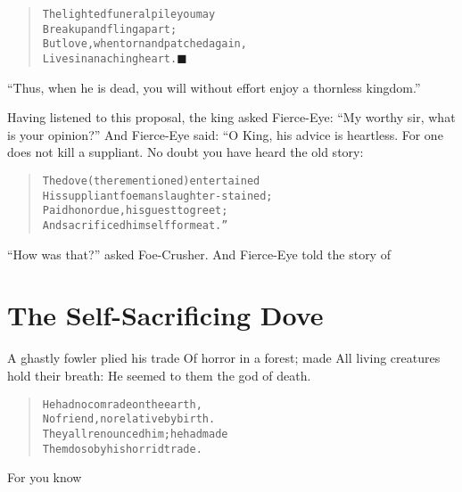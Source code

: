 \documentclass[article, twoside, 14pt]{memoir}
\newcommand{\qed}{\hfill \ensuremath{\blacksquare}}
\renewenvironment{verbatim}{%
\begin{quote}%
\vskip -10pt%
\begin{alltt}\normalfont\large}{\end{alltt}%
\end{quote}%
\vskip -10pt
} %
\begin{document}
\begin{verbatim}
The lighted funeral pile you may
    Break up and fling apart;
But love, when torn and patched again,
    Lives in an aching heart.\hyperref[s53]{\qed}
\end{verbatim}
``Thus, when he is dead, you will without effort enjoy a thornless kingdom.''

Having listened to this proposal, the king asked Fierce-Eye:
``My worthy sir, what is your opinion?'' And Fierce-Eye said: “O
King, his advice is heartless. For one does not kill a suppliant.
No doubt you have heard the old story:

\begin{verbatim}
The dove (there mentioned) entertained
His suppliant foeman slaughter-stained;
Paid honor due, his guest to greet;
And sacrificed himself for meat.”
\end{verbatim}
``How was that?'' asked Foe-Crusher. And Fierce-Eye told the story
of

\chapter{The Self-Sacrificing Dove}

\label{s55} A ghastly fowler plied his trade Of horror in a forest;
made All living creatures hold their breath: He seemed to them the
god of death.

\begin{verbatim}
He had no comrade on the earth,
No friend, no relative by birth.
They all renounced him; he had made
Them do so by his horrid trade.
\end{verbatim}
For you know
\end{document}
